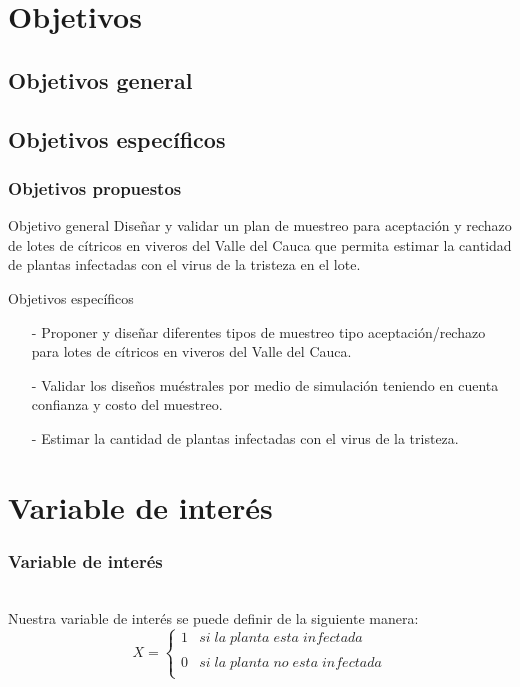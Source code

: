 \documentclass[10pt]{beamer}
\begin{document}
\section{Objetivos}
\subsection{Objetivos general}
\subsection{Objetivos específicos}
\begin{frame}
\frametitle{Objetivos propuestos}
\begin{block}{Objetivo general}
Diseñar y validar un plan de muestreo para aceptación y rechazo de lotes de cítricos en viveros del Valle del Cauca que permita estimar la cantidad de plantas infectadas con el virus de la tristeza en el lote.
\end{block}
\begin{block}{Objetivos específicos}
\begin{itemize}
\justifying
\item[-]Proponer y diseñar diferentes tipos de muestreo tipo aceptación/rechazo para lotes de cítricos en viveros del Valle del Cauca.
\item[-]Validar los diseños muéstrales por medio de simulación teniendo en cuenta confianza y costo del muestreo.
\item[-]Estimar la cantidad de plantas infectadas con el virus de la tristeza.
\end{itemize}
\end{block}
\end{frame}

\section{Variable de interés}
\begin{frame}
\frametitle{Variable de interés}
~\\Nuestra variable de interés se puede definir de la siguiente manera:
$$X= \left\{\begin{array}{cc}
             1 &   si \; la \; planta \; esta \; infectada \\
             \\ 0 &  si \; la \; planta \; no \; esta \; infectada \\
             \end{array}
   \right.$$
\end{frame}
\end{document}
